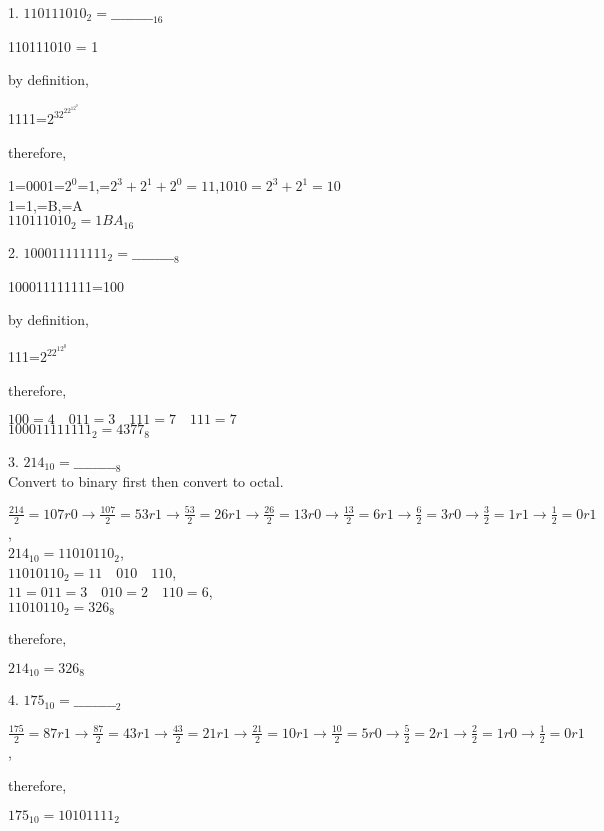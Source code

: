 \documentclass{article}
\begin{document}
    1. $110111010_2 = \_\_\_\_\_\_\_\_\__{16}$ 
    \begin{center}
        110111010 = 1
    \end{center}
    by definition,
    \begin{center}
        1111=$2^32^22^12^0$
    \end{center}
    therefore,
    \begin{center}
        1=0001=$2^0$=1,=$2^3+2^1+2^0=11$,\quad$1010=2^3+2^1=10$\\
        1=1,=B,=A\\
        $110111010_2 = 1BA_{16}$
    \end{center} \par
    2. $100011111111_2 = \_\_\_\_\_\_\_\_\__{8}$
    \begin{center}
        100011111111=100
    \end{center}
    by definition,
    \begin{center}
        111=$2^22^12^0$
    \end{center}
    therefore,
    \begin{center}
        $100=4\quad011=3\quad111=7\quad111=7$\\
        $100011111111_2 = 4377_{8}$
    \end{center} \par
    3. $214_{10}=\_\_\_\_\_\_\_\_\__8$\\Convert to binary first then convert to octal.
    \begin{center}
        $\frac{214}{2}=107r0\longrightarrow\frac{107}{2}=53r1\longrightarrow\frac{53}{2}=26r1\longrightarrow\frac{26}{2}=13r0\longrightarrow
        \frac{13}{2}=6r1\longrightarrow\frac{6}{2}=3r0\longrightarrow\frac{3}{2}=1r1\longrightarrow\frac{1}{2}=0r1$,\\
        $214_{10}=11010110_2$,\\$11010110_2=11\quad 010\quad 110$,\\$11=011=3\quad010=2\quad110=6$,\\$11010110_2=326_8$
    \end{center}
    therefore,
    \begin{center}
        $214_10=326_8$
    \end{center}
    

    4. $175_{10}=\_\_\_\_\_\_\_\_\__2$
    \begin{center}
        $\frac{175}{2}=87r1\longrightarrow\frac{87}{2}=43r1\longrightarrow\frac{43}{2}=21r1\longrightarrow\frac{21}{2}=10r1
        \longrightarrow\frac{10}{2}=5r0\longrightarrow\frac{5}{2}=2r1\longrightarrow\frac{2}{2}=1r0\longrightarrow\frac{1}{2}=0r1$,
    \end{center}
    therefore,
    \begin{center}
        $175_{10}=10101111_2$
    \end{center}
\end{document}
